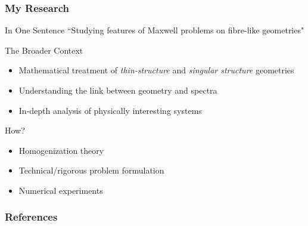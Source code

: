 \documentclass{beamer}
\begin{document}
\begin{frame}
	\frametitle{My Research}
	
	\begin{block}{In One Sentence}
		``Studying features of Maxwell problems on fibre-like geometries"
	\end{block}
	
	\begin{block}{The Broader Context}
		\begin{itemize}
			\item Mathematical treatment of \textit{thin-structure} and \textit{singular structure} geometries \cite{zhikov2000extension}
			\item Understanding the link between geometry and spectra \cite{exner2005convergence}
			\item In-depth analysis of physically interesting systems \cite{cooper2014bandgaps}
		\end{itemize}
	\end{block}
	
	\begin{block}{How?}
		\begin{itemize}
			\item Homogenization theory
			\item Technical/rigorous  problem formulation
			\item Numerical experiments
		\end{itemize}
	\end{block}
	
\end{frame}

\begin{frame}
	\frametitle{References}
	
	
	
\end{frame}
 
\end{document}
